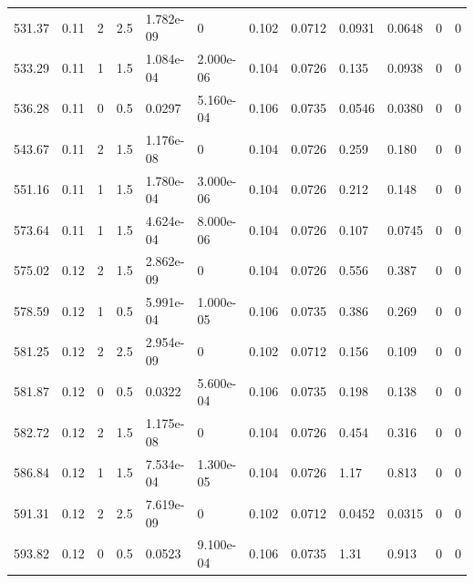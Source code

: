 \documentclass[preview]{standalone}
\begin{document}
{{{{\begin{tabular}{L{1.2cm}C{1.2cm} C{0.3cm}C{0.5cm} C{1.4cm}C{1.4cm} C{1.4cm}C{1.4cm} C{1.6cm}C{1.6cm} C{1.6cm}C{1.6cm}}
  531.37  &  0.11  & 2     & 2.5 &  1.782e-09  & 0  &  0.102&   0.0712& 0.0931 & 0.0648   &  0 & 0  \\ 
  533.29  &  0.11  & 1     & 1.5 &  1.084e-04  & 2.000e-06  &  0.104&   0.0726& 0.135 & 0.0938   &  0 & 0  \\ 
  536.28  &  0.11  & 0     & 0.5 &  0.0297  & 5.160e-04  &  0.106&   0.0735& 0.0546 & 0.0380   &  0 & 0  \\ 
  543.67  &  0.11  & 2     & 1.5 &  1.176e-08  & 0  &  0.104&   0.0726& 0.259 & 0.180   &  0 & 0  \\ 
  551.16  &  0.11  & 1     & 1.5 &  1.780e-04  & 3.000e-06  &  0.104&   0.0726& 0.212 & 0.148   &  0 & 0  \\ 
  573.64  &  0.11  & 1     & 1.5 &  4.624e-04  & 8.000e-06  &  0.104&   0.0726& 0.107 & 0.0745   &  0 & 0  \\ 
  575.02  &  0.12  & 2     & 1.5 &  2.862e-09  & 0  &  0.104&   0.0726& 0.556 & 0.387   &  0 & 0  \\ 
  578.59  &  0.12  & 1     & 0.5 &  5.991e-04  & 1.000e-05  &  0.106&   0.0735& 0.386 & 0.269   &  0 & 0  \\ 
  581.25  &  0.12  & 2     & 2.5 &  2.954e-09  & 0  &  0.102&   0.0712& 0.156 & 0.109   &  0 & 0  \\ 
  581.87  &  0.12  & 0     & 0.5 &  0.0322  & 5.600e-04  &  0.106&   0.0735& 0.198 & 0.138   &  0 & 0  \\ 
  582.72  &  0.12  & 2     & 1.5 &  1.175e-08  & 0  &  0.104&   0.0726& 0.454 & 0.316   &  0 & 0  \\ 
  586.84  &  0.12  & 1     & 1.5 &  7.534e-04  & 1.300e-05  &  0.104&   0.0726& 1.17 & 0.813   &  0 & 0  \\ 
  591.31  &  0.12  & 2     & 2.5 &  7.619e-09  & 0  &  0.102&   0.0712& 0.0452 & 0.0315   &  0 & 0  \\ 
  593.82  &  0.12  & 0     & 0.5 &  0.0523  & 9.100e-04  &  0.106&   0.0735& 1.31 & 0.913   &  0 & 0  \\ 
\hline 
\end{tabular} 

}}}}
\end{document}
